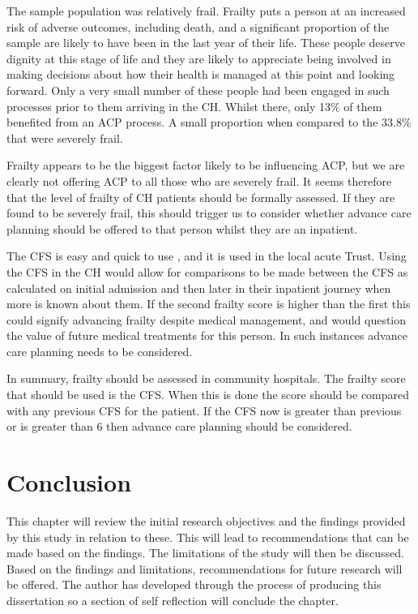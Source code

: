 \documentclass
[
	12pt,
	a4paper,
	oneside,
]{report}
\begin{document}
The sample population was relatively frail. Frailty puts a person at an 
increased risk of adverse outcomes, including death, and a significant
proportion of the sample are likely to have been in the last year of their life.
These people deserve dignity at this stage of life and they are likely
to appreciate being involved in making decisions about how their health is
managed at this point and looking forward. Only a very small number of these 
people had been engaged in such processes prior to them arriving in the CH.
Whilst there, only 13\% of them benefited from an ACP process. A small 
proportion when compared to the 33.8\% that were severely frail.

Frailty 
appears to be the biggest factor likely to be influencing ACP, but we are 
clearly
not offering ACP to all those who are severely frail. It seems therefore that
the level of frailty of CH patients should be formally assessed. If they 
are found 
to be severely frail, this should trigger us to consider whether advance 
care planning should be offered to that person whilst they are an inpatient.

The CFS is easy and quick to use \parencite{elliott:17}, and it is used in the 
local acute Trust. 
Using the CFS in the CH would allow for comparisons to be made between the CFS 
as calculated on initial admission and then later in their inpatient journey
when more is known about them. If the second frailty score is higher than the
first this could signify advancing frailty despite medical management, 
and would question the value of future medical treatments for this person.
In such instances advance care planning needs to be considered. 

In summary, frailty should be assessed in community hospitals. The frailty score
that should be used is the CFS. When this is done the score should be compared
with any previous CFS for the patient. If the CFS now is greater than previous
or is greater than 6 then advance care planning should be considered.

\chapter{Conclusion}

This chapter will review the initial research objectives and the findings
provided by this study in relation to these. 
This will lead to recommendations that can be made based on the findings. The
limitations of the study will then be discussed. Based on the findings and 
limitations, recommendations for future research will be offered. The author
has developed through the process of producing this dissertation so a section
of self reflection will conclude the chapter.
\end{document}
